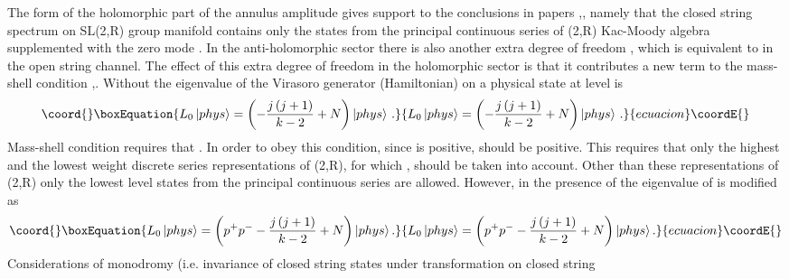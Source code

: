 \documentclass[a4paper,12pt]{article}
\begin{document}
The form of the holomorphic part of the annulus amplitude gives support to
the conclusions in papers \cite{bars1},\cite{BDM}, namely that the closed
string spectrum on SL(2,R) group manifold contains only the states from the
principal continuous series of \coordHE{}(2,R) Kac-Moody
algebra supplemented with the zero mode \coordHE{}. In the anti-holomorphic
sector there is also another extra degree of freedom \coordHE{}, which
is equivalent to \coordHE{} in the open string channel. The effect of this
extra degree of freedom in the holomorphic sector is that it contributes a
new term to the mass-shell condition \cite{bars1},\cite{BDM}. Without \coordHE{}
the eigenvalue of the Virasoro generator \coordHE{} (Hamiltonian) on a physical
state at level \coordHE{} is
\begin{equation}\coord{}\boxEquation{
L_{0}\left| phys\right\rangle =\left( -\frac{j\left( j+1\right) }{k-2}
+N\right) \left| phys\right\rangle \,.  \label{L0-discrete}
}{
L_{0}\left| phys\right\rangle =\left( -\frac{j\left( j+1\right) }{k-2}
+N\right) \left| phys\right\rangle \,.  }{ecuacion}\coordE{}\end{equation}
Mass-shell condition requires that \coordHE{}. In order to obey this
condition, since \coordHE{} is positive, \coordHE{} should be positive.
This requires that only the highest and the lowest weight discrete series
representations of \coordHE{}(2,R), for which \coordHE{}, should be taken into account. Other than these
representations of \coordHE{}(2,R) only the lowest level states
from the principal continuous series are allowed. However, in the presence
of \coordHE{} the eigenvalue of \coordHE{} is modified as
\begin{equation}\coord{}\boxEquation{
L_{0}\left| phys\right\rangle =\left( p^{+}p^{-}-\frac{j\left( j+1\right) }{
k-2}+N\right) \left| phys\right\rangle .  \label{L0-principal}
}{
L_{0}\left| phys\right\rangle =\left( p^{+}p^{-}-\frac{j\left( j+1\right) }{
k-2}+N\right) \left| phys\right\rangle .  }{ecuacion}\coordE{}\end{equation}
Considerations of monodromy (i.e. invariance of closed string states under
transformation \myHighlight{$\sigma \rightarrow \sigma +2\pi $}\coordHE{} on closed string
\end{document}

